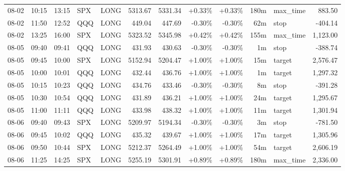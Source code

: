 \documentclass[11pt,a4paper,twoside]{article}
\begin{document}
\begin{center}
\begin{longtable}{>{\color{txtmain}}l l l l l r r r r r >{\color{txtmain}}l r}
08-02 & 10:15 & 13:15 & SPX & LONG & 5313.67 & 5331.34 & \textcolor{wingreen}{+0.33\%} & \textcolor{wingreen}{+0.33\%} & 180m & max\_time & \textcolor{wingreen}{883.50} \\
08-02 & 11:50 & 12:52 & QQQ & LONG & 449.04 & 447.69 & \textcolor{lossred}{-0.30\%} & \textcolor{lossred}{-0.30\%} & 62m & stop & \textcolor{lossred}{-404.14} \\
08-02 & 13:25 & 16:00 & SPX & LONG & 5323.52 & 5345.98 & \textcolor{wingreen}{+0.42\%} & \textcolor{wingreen}{+0.42\%} & 155m & max\_time & \textcolor{wingreen}{1,123.00} \\
08-05 & 09:40 & 09:41 & QQQ & LONG & 431.93 & 430.63 & \textcolor{lossred}{-0.30\%} & \textcolor{lossred}{-0.30\%} & 1m & stop & \textcolor{lossred}{-388.74} \\
08-05 & 09:45 & 10:00 & SPX & LONG & 5152.94 & 5204.47 & \textcolor{wingreen}{+1.00\%} & \textcolor{wingreen}{+1.00\%} & 15m & target & \textcolor{wingreen}{2,576.47} \\
08-05 & 10:00 & 10:01 & QQQ & LONG & 432.44 & 436.76 & \textcolor{wingreen}{+1.00\%} & \textcolor{wingreen}{+1.00\%} & 1m & target & \textcolor{wingreen}{1,297.32} \\
08-05 & 10:15 & 10:23 & QQQ & LONG & 434.76 & 433.46 & \textcolor{lossred}{-0.30\%} & \textcolor{lossred}{-0.30\%} & 8m & stop & \textcolor{lossred}{-391.28} \\
08-05 & 10:30 & 10:54 & QQQ & LONG & 431.89 & 436.21 & \textcolor{wingreen}{+1.00\%} & \textcolor{wingreen}{+1.00\%} & 24m & target & \textcolor{wingreen}{1,295.67} \\
08-05 & 11:00 & 11:11 & QQQ & LONG & 433.98 & 438.32 & \textcolor{wingreen}{+1.00\%} & \textcolor{wingreen}{+1.00\%} & 11m & target & \textcolor{wingreen}{1,301.94} \\
08-06 & 09:40 & 09:43 & SPX & LONG & 5209.97 & 5194.34 & \textcolor{lossred}{-0.30\%} & \textcolor{lossred}{-0.30\%} & 3m & stop & \textcolor{lossred}{-781.50} \\
08-06 & 09:45 & 10:02 & QQQ & LONG & 435.32 & 439.67 & \textcolor{wingreen}{+1.00\%} & \textcolor{wingreen}{+1.00\%} & 17m & target & \textcolor{wingreen}{1,305.96} \\
08-06 & 09:50 & 10:44 & SPX & LONG & 5212.37 & 5264.49 & \textcolor{wingreen}{+1.00\%} & \textcolor{wingreen}{+1.00\%} & 54m & target & \textcolor{wingreen}{2,606.19} \\
08-06 & 11:25 & 14:25 & SPX & LONG & 5255.19 & 5301.91 & \textcolor{wingreen}{+0.89\%} & \textcolor{wingreen}{+0.89\%} & 180m & max\_time & \textcolor{wingreen}{2,336.00} \\

\end{longtable}
\end{center}
\end{document}
